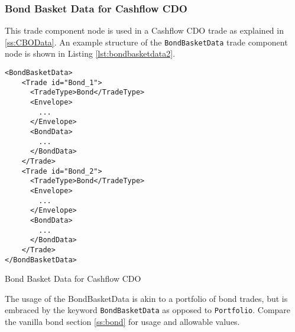 \subsubsection{Bond Basket Data for Cashflow CDO}
\label{ss:bondbasketdata} 
This trade component node is used in a Cashflow CDO trade as explained in \ref{ss:CBOData}.
An example structure of the \lstinline!BondBasketData! trade component node is shown in Listing \ref{lst:bondbasketdata2}.

\begin{listing}[H]
\begin{verbatim}
<BondBasketData>
    <Trade id="Bond_1">
      <TradeType>Bond</TradeType>
      <Envelope>
        ...
      </Envelope>
      <BondData>
        ...
      </BondData>
    </Trade>
    <Trade id="Bond_2">
      <TradeType>Bond</TradeType>
      <Envelope>
        ...
      </Envelope>
      <BondData>
        ...
      </BondData>
    </Trade>
</BondBasketData>
\end{verbatim}
\caption{Bond Basket Data for Cashflow CDO}
\label{lst:bondbasketdata2}
\end{listing}

The usage of the BondBasketData is akin to a portfolio of bond trades, 
but is embraced by the keyword \lstinline!BondBasketData! as opposed to \lstinline!Portfolio!.
Compare the vanilla bond section \ref{ss:bond} for usage and allowable values. 

